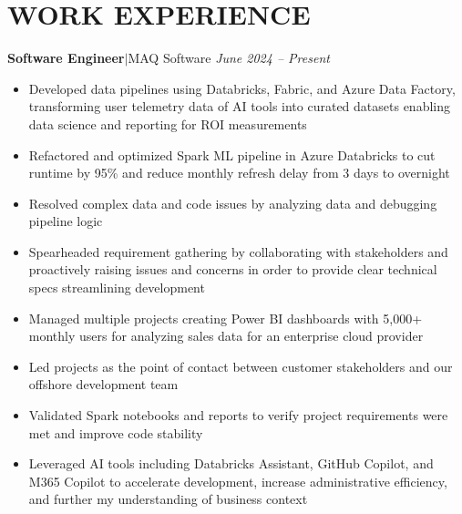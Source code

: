 \documentclass[11pt, a4paper, roman]{moderncv}
\newcommand{\entry}[4]{
	\textbf{#2}\:$|$\:#1 
	\hfill\textit{#3}
	#4
	\vspace{2mm}
}
\begin{document}
\vspace{4mm}
\linespread{2}
\maketitle
\linespread{1}
\vspace*{-14mm}



\section{WORK EXPERIENCE}

\entry{MAQ Software}{Software Engineer}{June 2024 -- Present}
{\begin{itemize}
	\item Developed data pipelines using Databricks, Fabric, and Azure Data Factory, transforming user telemetry data of AI tools into curated datasets enabling data science and reporting for ROI measurements
	\item Refactored and optimized Spark ML pipeline in Azure Databricks to cut runtime by 95\% and reduce monthly refresh delay from 3 days to overnight
	\item Resolved complex data and code issues by analyzing data and debugging pipeline logic
	\item Spearheaded requirement gathering by collaborating with stakeholders and proactively raising issues and concerns in order to provide clear technical specs streamlining development
	\item Managed multiple projects creating Power BI dashboards with 5,000+ monthly users for analyzing sales data for an enterprise cloud provider
	\item Led projects as the point of contact between customer stakeholders and our offshore development team
	\item Validated Spark notebooks and reports to verify project requirements were met and improve code stability
	\item Leveraged AI tools including Databricks Assistant, GitHub Copilot, and M365 Copilot to accelerate development, increase administrative efficiency, and further my understanding of business context
\end{itemize}
}
\end{document}
